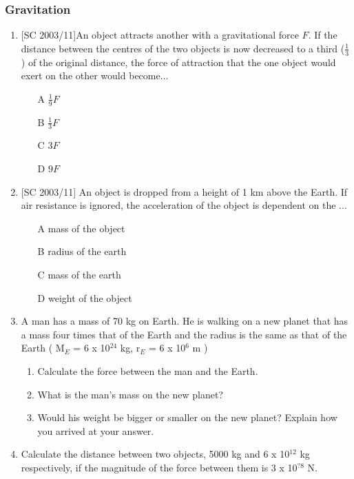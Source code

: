 \subsubsection{Gravitation}
\begin{enumerate}
\item{[SC 2003/11]An object attracts another with a gravitational force $F$. If the distance between the centres of the two objects is now decreased to a third ($\frac{1}{3}$) of the original distance, the force of attraction that the one object would exert on the other would become$\ldots$
\begin{enumerate}
\item [A]{$\frac{1}{9}F$}
\item [B]{$\frac{1}{3}F$}
\item [C]{$3F$}
\item [D]{$9F$}
\end{enumerate}}

\item{[SC 2003/11] An object is dropped from a height of 1 km above the Earth. If air resistance is ignored, the acceleration of the object is dependent on the $\dots$
\begin{enumerate}
\item [A]{mass of the object}
\item [B]{radius of the earth}
\item [C]{mass of the earth}
\item [D]{weight of the object}
\end{enumerate}}


\item {A man has a mass of 70 kg on Earth. He is walking on a new planet that has a mass four times that of the Earth and the radius is the same as that of the Earth ( M$_E$ = 6 x 10$^{24}$ kg, r$_E$ = 6 x 10$^6$ m )
\begin{enumerate}
\item Calculate the force between the man and the Earth.
\item What is the man's mass on the new planet?
\item Would his weight be bigger or smaller on the new planet? Explain how you arrived at your answer.
\end{enumerate}
}

\item {Calculate the distance between two objects, 5000 kg and 6 x 10$^{12}$ kg respectively, if the magnitude of the force between them is 3 x 10$^{?8}$ N.	}


\end{enumerate}
